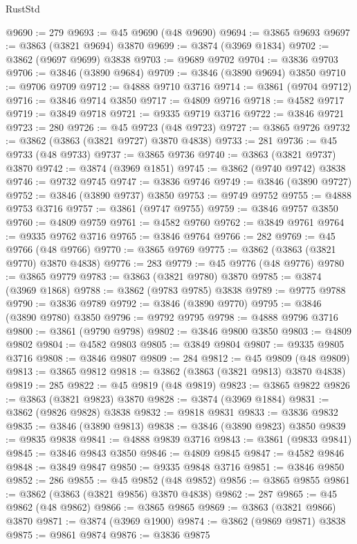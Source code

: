 \begin{lexlean}{RustStd}
\begin{coremodule}
@9690 := 279
@9693 := @45 @9690 (@48 @9690)
@9694 := @3865 @9693
@9697 := @3863 (@3821 @9694) @3870
@9699 := @3874 (@3969 @1834)
@9702 := @3862 (@9697 @9699) @3838
@9703 := @9689 @9702
@9704 := @3836 @9703
@9706 := @3846 (@3890 @9684)
@9709 := @3846 (@3890 @9694) @3850
@9710 := @9706 @9709
@9712 := @4888 @9710 @3716
@9714 := @3861 (@9704 @9712)
@9716 := @3846 @9714 @3850
@9717 := @4809 @9716
@9718 := @4582 @9717
@9719 := @3849 @9718
@9721 := @9335 @9719 @3716
@9722 := @3846 @9721
@9723 := 280
@9726 := @45 @9723 (@48 @9723)
@9727 := @3865 @9726
@9732 := @3862 (@3863 (@3821 @9727) @3870 @4838)
@9733 := 281
@9736 := @45 @9733 (@48 @9733)
@9737 := @3865 @9736
@9740 := @3863 (@3821 @9737) @3870
@9742 := @3874 (@3969 @1851)
@9745 := @3862 (@9740 @9742) @3838
@9746 := @9732 @9745
@9747 := @3836 @9746
@9749 := @3846 (@3890 @9727)
@9752 := @3846 (@3890 @9737) @3850
@9753 := @9749 @9752
@9755 := @4888 @9753 @3716
@9757 := @3861 (@9747 @9755)
@9759 := @3846 @9757 @3850
@9760 := @4809 @9759
@9761 := @4582 @9760
@9762 := @3849 @9761
@9764 := @9335 @9762 @3716
@9765 := @3846 @9764
@9766 := 282
@9769 := @45 @9766 (@48 @9766)
@9770 := @3865 @9769
@9775 := @3862 (@3863 (@3821 @9770) @3870 @4838)
@9776 := 283
@9779 := @45 @9776 (@48 @9776)
@9780 := @3865 @9779
@9783 := @3863 (@3821 @9780) @3870
@9785 := @3874 (@3969 @1868)
@9788 := @3862 (@9783 @9785) @3838
@9789 := @9775 @9788
@9790 := @3836 @9789
@9792 := @3846 (@3890 @9770)
@9795 := @3846 (@3890 @9780) @3850
@9796 := @9792 @9795
@9798 := @4888 @9796 @3716
@9800 := @3861 (@9790 @9798)
@9802 := @3846 @9800 @3850
@9803 := @4809 @9802
@9804 := @4582 @9803
@9805 := @3849 @9804
@9807 := @9335 @9805 @3716
@9808 := @3846 @9807
@9809 := 284
@9812 := @45 @9809 (@48 @9809)
@9813 := @3865 @9812
@9818 := @3862 (@3863 (@3821 @9813) @3870 @4838)
@9819 := 285
@9822 := @45 @9819 (@48 @9819)
@9823 := @3865 @9822
@9826 := @3863 (@3821 @9823) @3870
@9828 := @3874 (@3969 @1884)
@9831 := @3862 (@9826 @9828) @3838
@9832 := @9818 @9831
@9833 := @3836 @9832
@9835 := @3846 (@3890 @9813)
@9838 := @3846 (@3890 @9823) @3850
@9839 := @9835 @9838
@9841 := @4888 @9839 @3716
@9843 := @3861 (@9833 @9841)
@9845 := @3846 @9843 @3850
@9846 := @4809 @9845
@9847 := @4582 @9846
@9848 := @3849 @9847
@9850 := @9335 @9848 @3716
@9851 := @3846 @9850
@9852 := 286
@9855 := @45 @9852 (@48 @9852)
@9856 := @3865 @9855
@9861 := @3862 (@3863 (@3821 @9856) @3870 @4838)
@9862 := 287
@9865 := @45 @9862 (@48 @9862)
@9866 := @3865 @9865
@9869 := @3863 (@3821 @9866) @3870
@9871 := @3874 (@3969 @1900)
@9874 := @3862 (@9869 @9871) @3838
@9875 := @9861 @9874
@9876 := @3836 @9875

\end{coremodule}
\end{lexlean}

